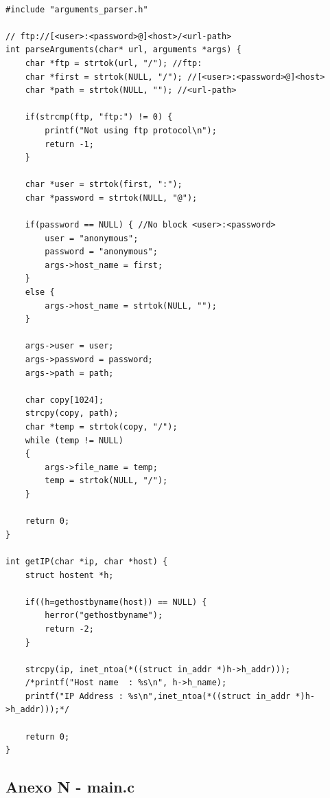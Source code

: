 \documentclass[11pt]{article}
\begin{document}
\begin{lstlisting}[style=CStyle]

#include "arguments_parser.h"

// ftp://[<user>:<password>@]<host>/<url-path>
int parseArguments(char* url, arguments *args) {
    char *ftp = strtok(url, "/"); //ftp:
    char *first = strtok(NULL, "/"); //[<user>:<password>@]<host>
    char *path = strtok(NULL, ""); //<url-path>

    if(strcmp(ftp, "ftp:") != 0) {
        printf("Not using ftp protocol\n");
        return -1;
    }

    char *user = strtok(first, ":");
    char *password = strtok(NULL, "@");

    if(password == NULL) { //No block <user>:<password>
        user = "anonymous";
        password = "anonymous";
        args->host_name = first;
    }
    else {
        args->host_name = strtok(NULL, "");
    }

    args->user = user;
    args->password = password;
    args->path = path;

    char copy[1024];
    strcpy(copy, path);
    char *temp = strtok(copy, "/");
    while (temp != NULL)
    {
        args->file_name = temp;
        temp = strtok(NULL, "/");
    }
    
    return 0;
}

int getIP(char *ip, char *host) {
    struct hostent *h;
    
    if((h=gethostbyname(host)) == NULL) {  
        herror("gethostbyname");
        return -2;
    }

    strcpy(ip, inet_ntoa(*((struct in_addr *)h->h_addr)));
    /*printf("Host name  : %s\n", h->h_name);
    printf("IP Address : %s\n",inet_ntoa(*((struct in_addr *)h->h_addr)));*/

    return 0;
}

\end{lstlisting}

\subsection{ Anexo N - main.c}
\end{document}

